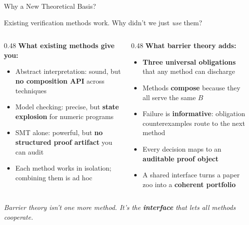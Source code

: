 \documentclass[aspectratio=169]{beamer}
\begin{document}
\begin{frame}{Why a New Theoretical Basis?}
\begin{center}
\large Existing verification methods work. Why didn't we just \emph{use} them?
\end{center}

\vspace{0.8em}
\begin{columns}[T]
\begin{column}{0.48\textwidth}
\textbf{What existing methods give you:}
\begin{itemize}
  \item Abstract interpretation: sound, but \textbf{no composition API} across techniques
  \item Model checking: precise, but \textbf{state explosion} for numeric programs
  \item SMT alone: powerful, but \textbf{no structured proof artifact} you can audit
  \item Each method works in isolation; combining them is ad hoc
\end{itemize}
\end{column}
\begin{column}{0.48\textwidth}
\textbf{What barrier theory adds:}
\begin{itemize}
  \item \textbf{Three universal obligations} that any method can discharge
  \item Methods \textbf{compose} because they all serve the same $B$
  \item Failure is \textbf{informative}: obligation counterexamples route to the next method
  \item Every decision maps to an \textbf{auditable proof object}
  \item A shared interface turns a paper zoo into a \textbf{coherent portfolio}
\end{itemize}
\end{column}
\end{columns}

\vspace{0.5em}
\centering
\textit{Barrier theory isn't one more method. It's the \textbf{interface} that lets all methods cooperate.}
\end{frame}
\end{document}
